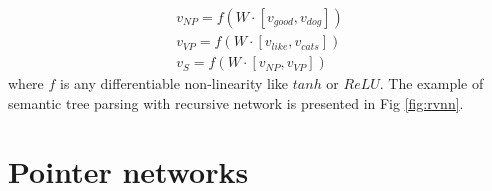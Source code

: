 \begin{equation}
\begin{split}
v_{NP} = f(W\cdot[v_{good}, v_{dog}])\\
v_{VP} = f(W\cdot[v_{like}, v_{cats}])\\
v_S = f(W\cdot[v_{NP}, v_{VP}])
\label{rvnn:example}
\end{split}
\end{equation}
where $f$ is any differentiable non-linearity like $tanh$ or $ReLU$. The example of semantic tree parsing with recursive network is presented in Fig \ref{fig:rvnn}. 

\section{Pointer networks}
